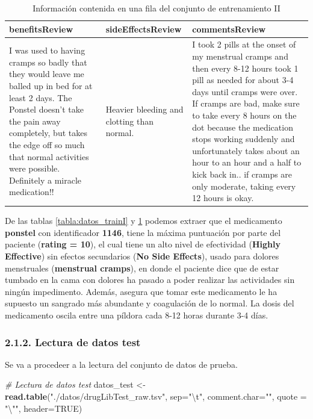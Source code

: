 \documentclass[spanish,]{article}
\newenvironment{Shaded}{\begin{snugshade}}{\end{snugshade}}
\newcommand{\KeywordTok}[1]{\textcolor[rgb]{0.13,0.29,0.53}{\textbf{#1}}}
\newcommand{\DataTypeTok}[1]{\textcolor[rgb]{0.13,0.29,0.53}{#1}}
\newcommand{\CharTok}[1]{\textcolor[rgb]{0.31,0.60,0.02}{#1}}
\newcommand{\StringTok}[1]{\textcolor[rgb]{0.31,0.60,0.02}{#1}}
\newcommand{\CommentTok}[1]{\textcolor[rgb]{0.56,0.35,0.01}{\textit{#1}}}
\newcommand{\OtherTok}[1]{\textcolor[rgb]{0.56,0.35,0.01}{#1}}
\newcommand{\NormalTok}[1]{#1}
\begin{document}
\begin{table}[h]
  \centering
    \begin{tabular}{|m{5cm}|m{3cm}|m{7cm}|}
      \hline
      \rowcolor[rgb]{0.94,0.97,1.0} \textbf{benefitsReview} & \textbf{sideEffectsReview} & \textbf{commentsReview} \\ \hline
      I was used to having cramps so badly that they would leave me balled up in bed for at least 2 days. The Ponstel doesn't take the pain away completely, but takes the edge off so much that normal activities were possible. Definitely a miracle medication!! & Heavier bleeding and clotting than normal. & I took 2 pills at the onset of my menstrual cramps and then every 8-12 hours took 1 pill as needed for about 3-4 days until cramps were over. If cramps are bad, make sure to take every 8 hours on the dot because the medication stops working suddenly and unfortunately takes about an hour to an hour and a half to kick back in.. if cramps are only moderate, taking every 12 hours is okay. \\ \hline
    \end{tabular}
  \caption{Información contenida en una fila del conjunto de entrenamiento II}
  \label{tabla:datos_trainII}
\end{table}

De las tablas \ref{tabla:datos_trainI} y \ref{tabla:datos_trainII}
podemos extraer que el medicamento \textbf{ponstel} con identificador
\textbf{1146}, tiene la máxima puntuación por parte del paciente
(\textbf{rating = 10}), el cual tiene un alto nivel de efectividad
(\textbf{Highly Effective}) sin efectos secundarios
(\textbf{No Side Effects}), usado para dolores menstruales
(\textbf{menstrual cramps}), en donde el paciente dice que de estar
tumbado en la cama con dolores ha pasado a poder realizar las
actividades sin ningún impedimento. Además, asegura que tomar este
medicamento le ha supuesto un sangrado más abundante y coagulación de lo
normal. La dosis del medicamento oscila entre una píldora cada 8-12
horas durante 3-4 días.

\subsubsection{2.1.2. Lectura de datos
test}\label{lectura-de-datos-test}

Se va a procedeer a la lectura del conjunto de datos de prueba.

\begin{Shaded}
\begin{Highlighting}[]
\CommentTok{# Lectura de datos test}
\NormalTok{datos_test <-}\StringTok{ }\KeywordTok{read.table}\NormalTok{(}\StringTok{"./datos/drugLibTest_raw.tsv"}\NormalTok{, }\DataTypeTok{sep=}\StringTok{"}\CharTok{\textbackslash{}t}\StringTok{"}\NormalTok{, }\DataTypeTok{comment.char=}\StringTok{""}\NormalTok{,}
                         \DataTypeTok{quote =} \StringTok{"}\CharTok{\textbackslash{}"}\StringTok{"}\NormalTok{, }\DataTypeTok{header=}\OtherTok{TRUE}\NormalTok{)}
\end{Highlighting}
\end{Shaded}
\end{document}
